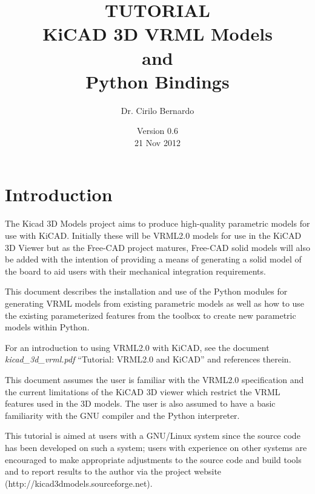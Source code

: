 \documentclass[a4paper, dvipdfm]{article}
\title{TUTORIAL\\
KiCAD 3D VRML Models\\
and\\
Python Bindings}
\date{Version 0.6\\
21 Nov 2012}
\author{Dr. Cirilo Bernardo}
\makeatletter
\def\maketitle{%
  \null
  \thispagestyle{empty}%
  \vfill
  \begin{center}\leavevmode
    \normalfont
{\LARGE \@title\par}%
    \vskip 1cm
{\Large \@author\par}%
    \vskip 1cm
{\Large \@date\par}%
  \end{center}%
  \vfill
  \null
  \cleardoublepage
}
\makeatother
\begin{document}
\maketitle

%
%

\setcounter{page}{1}

\section{Introduction}
The Kicad 3D Models project aims to produce high-quality parametric models for use
with KiCAD.  Initially these will be VRML2.0 models for use in the KiCAD 3D Viewer
but as the Free-CAD project matures, Free-CAD solid models will also be added with
the intention of providing a means of generating a solid model of the board to aid
users with their mechanical integration requirements.

This document describes the installation and use of the Python modules for generating
VRML models from existing parametric models as well as how to use the existing
parameterized features from the toolbox to create new parametric models within Python.

For an introduction to using VRML2.0 with KiCAD, see the document \emph{kicad\_3d\_vrml.pdf}
``Tutorial: VRML2.0 and KiCAD'' and references therein.

This document assumes the user is familiar with the VRML2.0 specification and the
current limitations of the KiCAD 3D viewer which restrict the VRML features used
in the 3D models. The user is also assumed to have a basic familiarity with
the GNU compiler and the Python interpreter.

This tutorial is aimed at users with a GNU/Linux system since the source code has
been developed on such a system; users with experience on other systems are
encouraged to make appropriate adjustments to the source code and build tools and
to report results to the author via the project website (http://kicad3dmodels.sourceforge.net).
\end{document}
